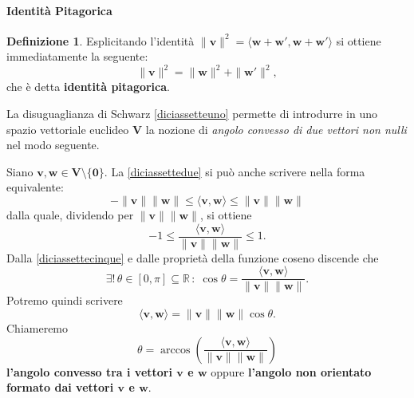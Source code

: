 \documentclass{article}
\theoremstyle{plain}
\theoremstyle{definition}
\newtheorem{defn}{Definizione}[section]
\theoremstyle{remark}
\begin{document}
\vspace{10pt}

\paragraph{Identità Pitagorica}
\begin{bxthm}
\begin{defn}
Esplicitando l'identità $\|\mathbf{v}\|^2 = \langle \mathbf{w} + \mathbf{w}', \mathbf{w} + \mathbf{w}' \rangle$ 
si ottiene immediatamente la seguente:
\[
\|\mathbf{v}\|^2 = \|\mathbf{w}\|^2 + \|\mathbf{w}'\|^2,
\]
che è detta \textbf{identità pitagorica}.    
\end{defn}
\end{bxthm}

\vspace{10pt}

La disuguaglianza di Schwarz \ref{diciassetteuno} permette di introdurre in uno spazio vettoriale euclideo $\mathbf{V}$ la nozione 
di \textit{angolo convesso di due vettori non nulli} nel modo seguente.

\vspace{10pt}

Siano $\mathbf{v}, \mathbf{w} \in \mathbf{V}\setminus\{\mathbf{0}\}$. La \ref{diciassettedue} si può anche
scrivere nella forma equivalente:
\[
- \|\mathbf{v}\| \|\mathbf{w}\| \leq \langle \mathbf{v}, \mathbf{w} \rangle \leq \|\mathbf{v}\| \|\mathbf{w}\|
\]
dalla quale, dividendo per $\|\mathbf{v}\| \|\mathbf{w}\|$, si ottiene
\begin{equation}\label{diciassettecinque}
-1 \leq \dfrac{\langle \mathbf{v}, \mathbf{w} \rangle}{\|\mathbf{v}\| \|\mathbf{w}\|} \leq 1.    
\end{equation}
Dalla \ref{diciassettecinque} e dalle proprietà della funzione coseno discende che 
\[
\exists!\,\theta\in[0,\pi]\subseteq\mathbb{R}\,:\;\cos \theta = \dfrac{\langle \mathbf{v}, \mathbf{w} \rangle}{\|\mathbf{v}\| \|\mathbf{w}\|}.
\]
Potremo quindi scrivere
\begin{equation}\label{diciassettesei}
    \langle \mathbf{v}, \mathbf{w} \rangle = \|\mathbf{v}\| \|\mathbf{w}\| \cos \theta.
\end{equation}
Chiameremo
\begin{equation}\label{diciassettesette}
    \theta = \arccos \left( \dfrac{\langle \mathbf{v}, \mathbf{w} \rangle}{\|\mathbf{v}\| \|\mathbf{w}\|} \right)
\end{equation}
\textbf{l'angolo convesso tra i vettori $\mathbf{v}$ e $\mathbf{w}$} oppure \textbf{l'angolo non orientato formato dai vettori $\mathbf{v}$ e $\mathbf{w}$}.
\end{document}
